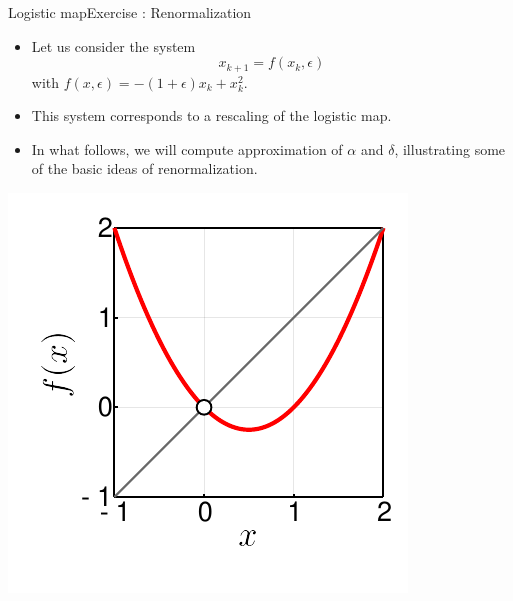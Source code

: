 \documentclass[usenames,dvipsnames,svgnames,10pt,aspectratio=169]{beamer}
\begin{document}
\begin{frame}[t, c]{Logistic map}{Exercise : Renormalization}
	\begin{minipage}{.68\textwidth}
		\begin{itemize}
			\item Let us consider the system
			\[
				x_{k+1} = f(x_k, \epsilon)
			\]
			with \( f(x, \epsilon) = -\left( 1 + \epsilon \right) x_k + x_k^2 \).

			\medskip

			\item This system corresponds to a rescaling of the logistic map.

			\medskip

			\item In what follows, we will compute approximation of \( \alpha \) and \( \delta \), illustrating some of the basic ideas of renormalization.
		\end{itemize}
	\end{minipage}%
	\hfill
	\begin{minipage}{.28\textwidth}
		\includegraphics[width=\textwidth]{renormalization_normal_form}
	\end{minipage}

	\vspace{1cm}
\end{frame}
\end{document}
